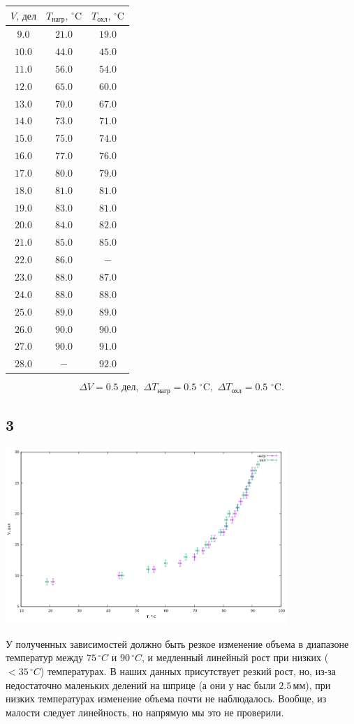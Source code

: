 \begin{center}
\begin{tabular}{|c|c|c|}\hline
$V,\,\text{дел}$&$T_{\text{нагр}},\,^\circ\text{C}$&$T_{\text{охл}},\,^\circ\text{C}$\\ \hline
$9.0$&$21.0$&$19.0$\\ \hline
$10.0$&$44.0$&$45.0$\\ \hline
$11.0$&$56.0$&$54.0$\\ \hline
$12.0$&$65.0$&$60.0$\\ \hline
$13.0$&$70.0$&$67.0$\\ \hline
$14.0$&$73.0$&$71.0$\\ \hline
$15.0$&$75.0$&$74.0$\\ \hline
$16.0$&$77.0$&$76.0$\\ \hline
$17.0$&$80.0$&$79.0$\\ \hline
$18.0$&$81.0$&$81.0$\\ \hline
$19.0$&$83.0$&$81.0$\\ \hline
$20.0$&$84.0$&$82.0$\\ \hline
$21.0$&$85.0$&$85.0$\\ \hline
$22.0$&$86.0$&$-$\\ \hline
$23.0$&$88.0$&$87.0$\\ \hline
$24.0$&$88.0$&$88.0$\\ \hline
$25.0$&$89.0$&$89.0$\\ \hline
$26.0$&$90.0$&$90.0$\\ \hline
$27.0$&$90.0$&$91.0$\\ \hline
$28.0$&$-$&$92.0$\\ \hline
\end{tabular}
\end{center}
$$\Delta V=0.5\,\,\text{дел},\,\,\Delta T_{\text{нагр}}=0.5\,\,^\circ\text{C},\,\,\Delta T_{\text{охл}}=0.5\,\,^\circ\text{C}.$$
\subsection*{3}
\begin{center}
\includegraphics[width=0.80\textwidth]{plot_0.png}
\end{center}
У полученных зависимостей должно быть резкое изменение объема в диапазоне температур между $75\,^\circ C$ и $90\,^\circ C$, и медленный линейный рост при низких ($<35\,^\circ C$) температурах. В наших данных присутствует резкий рост, но, из-за недостаточно маленьких делений на шприце (а они у нас были $2.5\,\text{мм}$), при низких температурах изменение объема почти не наблюдалось. Вообще, из малости следует линейность, но напрямую мы это не проверили.

